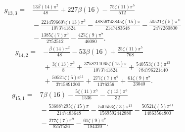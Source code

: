 \begin{align*}g_{13,3}={}&\frac{13 \beta(14) \pi^{2}}{48}+227 \beta(16)- \frac{75 \zeta(11) \pi^{5}}{512}\\
&{}- \frac{2214596607 \zeta(13) \pi^{3}}{1073741824}- \frac{48856743845 \zeta(15) \pi}{2147483648}- \frac{50521 \zeta(5) \pi^{11}}{2477260800}\\
&{}- \frac{1385 \zeta(7) \pi^{9}}{2752512}- \frac{427 \zeta(9) \pi^{7}}{46080}.\end{align*}
\begin{align*}g_{14,2}={}&- \frac{\beta(14) \pi^{2}}{48}- 53 \beta(16)+\frac{25 \zeta(11) \pi^{5}}{768}\\
&{}+\frac{3 \zeta(13) \pi^{3}}{8}+\frac{3758211065 \zeta(15) \pi}{1073741824}+\frac{540553 \zeta(3) \pi^{13}}{784796221440}\\
&{}+\frac{50521 \zeta(5) \pi^{11}}{3715891200}+\frac{277 \zeta(7) \pi^{9}}{1376256}+\frac{61 \zeta(9) \pi^{7}}{23040}.\end{align*}
\begin{align*}g_{15,1}={}&7 \beta(16)- \frac{5 \zeta(11) \pi^{5}}{1536}- \frac{\zeta(13) \pi^{3}}{32}\\
&{}- \frac{536887295 \zeta(15) \pi}{2147483648}- \frac{540553 \zeta(3) \pi^{13}}{1569592442880}- \frac{50521 \zeta(5) \pi^{11}}{14863564800}\\
&{}- \frac{277 \zeta(7) \pi^{9}}{8257536}- \frac{61 \zeta(9) \pi^{7}}{184320}.\end{align*}
